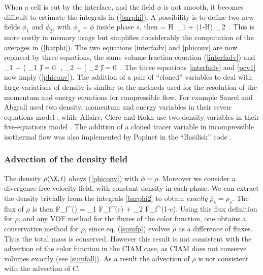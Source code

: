 When a cell is cut by the interface, and the field $\phi$ is not smooth, 
it becomes difficult to estimate the integrals in (\ref{barphi}). A possibility is to 
define two new fields $\phi_{1}$ and $\phi_{2}$, with $\phi_s = \phi$ 
inside phase $s$, then
\be
\phi = H \,\phi_1 + (1-H) \,\phi_2 \,.
\nd
This is more costly in memory usage but simplifies considerably the computation of the 
averages in (\ref{barphi}). The two equations \eqref{interfadv} and \eqref{phiconv} 
are now replaced by three equations,
the same volume fraction equation (\ref{interfadv}) and 
\be
\dert \phi_1 + \nabla \cdot ( \phi_1 \U) = 0 \,\,,\qquad
\dert \phi_2 + \nabla \cdot ( \phi_2 \U) = 0 \,.
\label{pcv1}
\nd
The three equations \eqref{interfadv} and \eqref{pcv1} now imply (\ref{phiconv}). 
The addition of a pair of ``cloned'' variables to deal with large 
variations of density is similar to the methods used for the resolution of the 
momentum and energy equations for compressible flow. For example Saurel and Abgrall 
used two density, momentum and energy variables in their seven-equations model 
\cite{Saurel99}, while Allaire, Clerc and Kokh use two density variables 
in their five-equations model \cite{allaire02}. The addition of a cloned 
tracer variable in incompressible isothermal flow was also implemented by Popinet in 
the ``Basilisk'' code \cite{basilisk}. 

\subsubsection{Advection of the density field}

The density $\rho(\X,t)$ obeys (\ref{phiconv}) with $\phi = \rho$. 
Moreover we consider a divergence-free velocity field, with constant density 
in each phase. We can extract the density trivially from the integrals 
\eqref{barphi2} to obtain {\em exactly} $\bar \rho_s = \rho_s$. 
The flux of $\rho$ is then
\be
F_f^{(\rho)} = \rho_1 F_f^{(c)} +  \rho_2 F_f^{(1-c)}.\label{fluxrho}
\nd
Using this flux definition for $\rho$, and any VOF method for the fluxes of the color 
function, one obtains a conservative method for $\rho$, since eq. (\ref{sumfp}) 
evolves $\rho$ as a difference of fluxes. Thus the total mass is conserved. 
However this result is not consistent with the advection of the color function in the 
CIAM case, as CIAM does not conserve volumes exactly (see  \eqref{sumfall}).
As a result the advection of $\rho$ 
is not consistent with the advection of $C$. 

